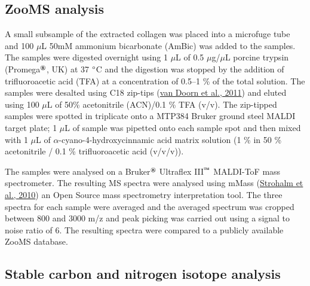 \documentclass[preprint, 3p, authoryear]{elsarticle} %
\begin{document}
\hypertarget{zooms-analysis}{%
\subsection{ZooMS analysis}\label{zooms-analysis}}

A small subsample of the extracted collagen was placed into a microfuge tube and 100 \(\mu\)L 50mM ammonium bicarbonate (AmBic) was added to the samples. The samples were digested overnight using 1 \(\mu\)L of 0.5 \(\mu\)g/\(\mu\)L porcine trypsin (Promega\(^\text{\textregistered}\), UK) at 37 \(\text{\textdegree}\)C and the digestion was stopped by the addition of trifluoroacetic acid (TFA) at a concentration of 0.5--1 \% of the total solution. The samples were desalted using C18 zip-tips (\protect\hyperlink{ref-vandoorn_etal11}{van Doorn et al., 2011}) and eluted using 100 \(\mu\)L of 50\% acetonitrile (ACN)/0.1 \% TFA (v/v). The zip-tipped samples were spotted in triplicate onto a MTP384 Bruker ground steel MALDI target plate; 1 \(\mu\)L of sample was pipetted onto each sample spot and then mixed with 1 \(\mu\)L of \(\alpha\)-cyano-4-hydroxycinnamic acid matrix solution (1 \% in 50 \% acetonitrile / 0.1 \% trifluoroacetic acid (v/v/v)).

The samples were analysed on a Bruker\(^\text{\textregistered}\) Ultraflex III\(^\text{\texttrademark}\) MALDI-ToF mass spectrometer. The resulting MS spectra were analysed using mMass (\protect\hyperlink{ref-strohalm_etal10}{Strohalm et al., 2010}) an Open Source mass spectrometry interpretation tool. The three spectra for each sample were averaged and the averaged spectrum was cropped between 800 and 3000 m/z and peak picking was carried out using a signal to noise ratio of 6. The resulting spectra were compared to a publicly available ZooMS database.

\hypertarget{stable-carbon-and-nitrogen-isotope-analysis}{%
\subsection{Stable carbon and nitrogen isotope analysis}\label{stable-carbon-and-nitrogen-isotope-analysis}}
\end{document}
